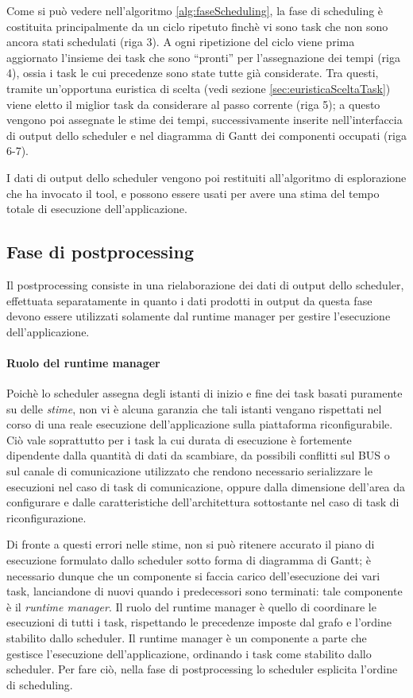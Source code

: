 Come si può vedere nell'algoritmo \ref{alg:faseScheduling}, la fase di 
scheduling è costituita principalmente da un ciclo ripetuto finchè vi sono 
task che non sono ancora stati schedulati (riga 3). A ogni ripetizione del ciclo viene 
prima aggiornato l'insieme dei task che sono ``pronti'' per l'assegnazione dei 
tempi (riga 4), ossia i task le cui precedenze sono state tutte già considerate. Tra 
questi, tramite un'opportuna euristica di scelta (vedi sezione 
\ref{sec:euristicaSceltaTask}) viene eletto il miglior task da considerare al 
passo corrente (riga 5); a questo vengono poi assegnate le stime dei tempi, 
successivamente inserite nell'interfaccia di output dello scheduler e nel 
diagramma di Gantt dei componenti occupati (riga 6-7).

I dati di output dello scheduler vengono poi restituiti all'algoritmo di 
esplorazione che ha invocato il tool, e possono essere usati per avere una 
stima del tempo totale di esecuzione dell'applicazione.


\subsection{Fase di postprocessing}
Il postprocessing consiste in una rielaborazione dei dati di output dello 
scheduler, effettuata separatamente in quanto i dati prodotti in output da 
questa fase devono essere utilizzati solamente dal runtime manager per gestire 
l'esecuzione dell'applicazione.

\paragraph{Ruolo del runtime manager}
Poichè lo scheduler assegna degli istanti di inizio e fine dei task basati 
puramente su delle \emph{stime}, non vi è alcuna garanzia che tali istanti 
vengano rispettati nel corso di una reale esecuzione dell'applicazione sulla 
piattaforma riconfigurabile. Ciò vale soprattutto per i task la cui
durata di esecuzione è fortemente dipendente dalla quantità di dati da 
scambiare, da possibili conflitti sul BUS o sul canale di comunicazione 
utilizzato che rendono necessario serializzare le esecuzioni nel caso di 
task di comunicazione, oppure dalla dimensione dell'area da configurare e 
dalle caratteristiche dell'architettura sottostante nel caso di task di 
riconfigurazione.

Di fronte a questi errori nelle stime, non si può ritenere accurato il piano di 
esecuzione formulato dallo scheduler sotto forma di diagramma di Gantt; è 
necessario dunque che un componente si faccia carico dell'esecuzione dei vari 
task, lanciandone di nuovi quando i predecessori sono terminati: tale 
componente è il \emph{runtime manager}. Il ruolo del runtime manager è quello 
di coordinare le esecuzioni di tutti i task, rispettando le precedenze imposte 
dal grafo e l'ordine stabilito dallo scheduler. Il runtime manager \`e un componente
a parte che gestisce l'esecuzione dell'applicazione, ordinando i task come stabilito
dallo scheduler. Per fare ci\`o, nella fase di postprocessing lo scheduler esplicita
l'ordine di scheduling.

